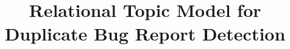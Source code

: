 \documentclass[10pt,conference]{IEEEtran}
\begin{document}
\title{Relational Topic Model for\\ Duplicate Bug Report Detection}



\maketitle
\end{document}

